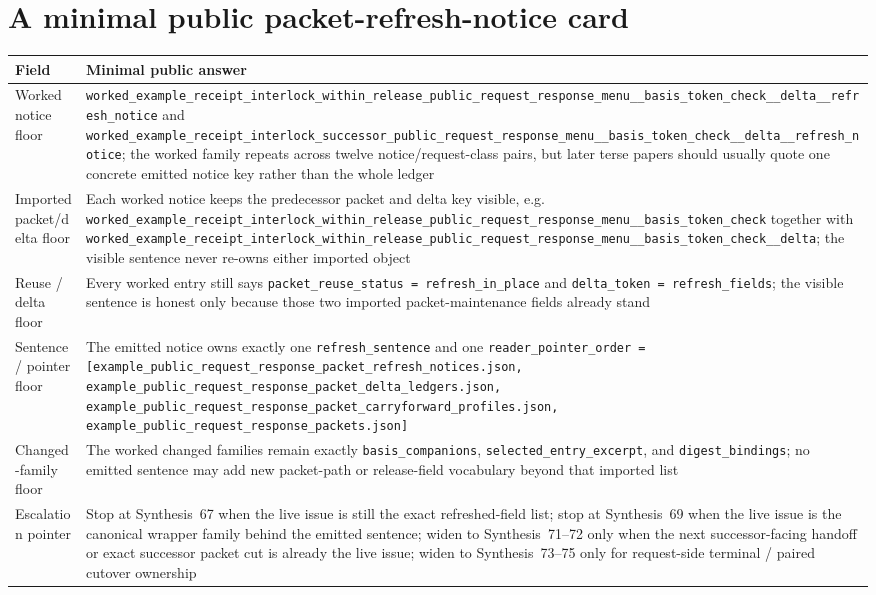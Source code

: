 \documentclass[11pt]{article}
\begin{document}
\section{A minimal public packet-refresh-notice card}
\begin{table}[t]
\centering
\small
\begin{tabularx}{\linewidth}{@{}lX@{}}
\toprule
Field & Minimal public answer \\
\midrule
Worked notice floor & \nolinkurl{worked_example_receipt_interlock_within_release_public_request_response_menu__basis_token_check__delta__refresh_notice} and \nolinkurl{worked_example_receipt_interlock_successor_public_request_response_menu__basis_token_check__delta__refresh_notice}; the worked family repeats across twelve notice/request-class pairs, but later terse papers should usually quote one concrete emitted notice key rather than the whole ledger \\
Imported packet/delta floor & Each worked notice keeps the predecessor packet and delta key visible, e.g. \nolinkurl{worked_example_receipt_interlock_within_release_public_request_response_menu__basis_token_check} together with \nolinkurl{worked_example_receipt_interlock_within_release_public_request_response_menu__basis_token_check__delta}; the visible sentence never re-owns either imported object \\
Reuse / delta floor & Every worked entry still says \nolinkurl{packet_reuse_status = refresh_in_place} and \nolinkurl{delta_token = refresh_fields}; the visible sentence is honest only because those two imported packet-maintenance fields already stand \\
Sentence / pointer floor & The emitted notice owns exactly one \nolinkurl{refresh_sentence} and one \nolinkurl{reader_pointer_order = [example_public_request_response_packet_refresh_notices.json, example_public_request_response_packet_delta_ledgers.json, example_public_request_response_packet_carryforward_profiles.json, example_public_request_response_packets.json]} \\
Changed-family floor & The worked changed families remain exactly \nolinkurl{basis_companions}, \nolinkurl{selected_entry_excerpt}, and \nolinkurl{digest_bindings}; no emitted sentence may add new packet-path or release-field vocabulary beyond that imported list \\
Escalation pointer & Stop at Synthesis~67 when the live issue is still the exact refreshed-field list; stop at Synthesis~69 when the live issue is the canonical wrapper family behind the emitted sentence; widen to Synthesis~71--72 only when the next successor-facing handoff or exact successor packet cut is already the live issue; widen to Synthesis~73--75 only for request-side terminal / paired cutover ownership \\

\end{tabularx}
\end{table}
\end{document}

